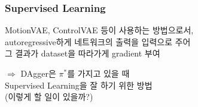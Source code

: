 \documentclass[11pt,xcolor={dvipsnames},hyperref={pdftex,pdfpagemode=UseNone,hidelinks,pdfdisplaydoctitle=true},usepdftitle=false]{beamer}
\begin{document}
\begin{frame}
\frametitle{Supervised Learning}

MotionVAE, ControlVAE 등이 사용하는 방법으로서, \\
autoregressive하게 네트워크의 출력을 입력으로 주어 \\ 
그 결과가 dataset을 따라가게 gradient 부여

\vspace{5mm}

$\Longrightarrow$ DAgger은 $\pi^*$를 가지고 있을 때  \\ 
Supervised Learning을 잘 하기 위한 방법 \\
(이렇게 할 일이 있을까?)

\end{frame}





\end{document}
